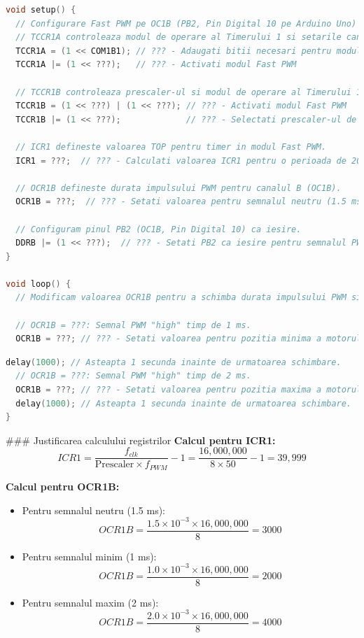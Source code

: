 \documentclass{report}
\begin{document}
\begin{lstlisting}[language=C++]
void setup() {
  // Configurare Fast PWM pe OC1B (PB2, Pin Digital 10 pe Arduino Uno)
  // TCCR1A controleaza modul de operare al Timerului 1 si setarile canalelor de iesire.
  TCCR1A = (1 << COM1B1); // ??? - Adaugati bitii necesari pentru modul Clear on Compare Match
  TCCR1A |= (1 << ???);   // ??? - Activati modul Fast PWM 

  // TCCR1B controleaza prescaler-ul si modul de operare al Timerului 1.
  TCCR1B = (1 << ???) | (1 << ???); // ??? - Activati modul Fast PWM 
  TCCR1B |= (1 << ???);             // ??? - Selectati prescaler-ul de 8 

  // ICR1 defineste valoarea TOP pentru timer in modul Fast PWM.
  ICR1 = ???;  // ??? - Calculati valoarea ICR1 pentru o perioada de 20 ms 

  // OCR1B defineste durata impulsului PWM pentru canalul B (OC1B).
  OCR1B = ???;  // ??? - Setati valoarea pentru semnalul neutru (1.5 ms)

  // Configuram pinul PB2 (OC1B, Pin Digital 10) ca iesire.
  DDRB |= (1 << ???);  // ??? - Setati PB2 ca iesire pentru semnalul PWM
}

void loop() {
  // Modificam valoarea OCR1B pentru a schimba durata impulsului PWM si pozitia servo-ului.

  // OCR1B = ???: Semnal PWM "high" timp de 1 ms.
  OCR1B = ???; // ??? - Setati valoarea pentru pozitia minima a motorului
  \end{lstlisting}
  \newpage
  \vspace*{1cm}
  \begin{lstlisting}[language=C++]
  delay(1000); // Asteapta 1 secunda inainte de urmatoarea schimbare.
  // OCR1B = ???: Semnal PWM "high" timp de 2 ms.
  OCR1B = ???; // ??? - Setati valoarea pentru pozitia maxima a motorului
  delay(1000); // Asteapta 1 secunda inainte de urmatoarea schimbare.
}
\end{lstlisting}

### Justificarea calculului registrilor
\textbf{Calcul pentru ICR1:}
\[
ICR1 = \frac{f_{clk}}{\text{Prescaler} \times f_{PWM}} - 1 = \frac{16,000,000}{8 \times 50} - 1 = 39,999
\]

\textbf{Calcul pentru OCR1B:}
\begin{itemize}
    \item Pentru semnalul neutru (1.5 ms): 
    \[
    OCR1B = \frac{1.5 \times 10^{-3} \times 16,000,000}{8} = 3000
    \]
    \item Pentru semnalul minim (1 ms): 
    \[
    OCR1B = \frac{1.0 \times 10^{-3} \times 16,000,000}{8} = 2000
    \]
    \item Pentru semnalul maxim (2 ms): 
    \[
    OCR1B = \frac{2.0 \times 10^{-3} \times 16,000,000}{8} = 4000
    \]
\end{itemize}
\end{document}
